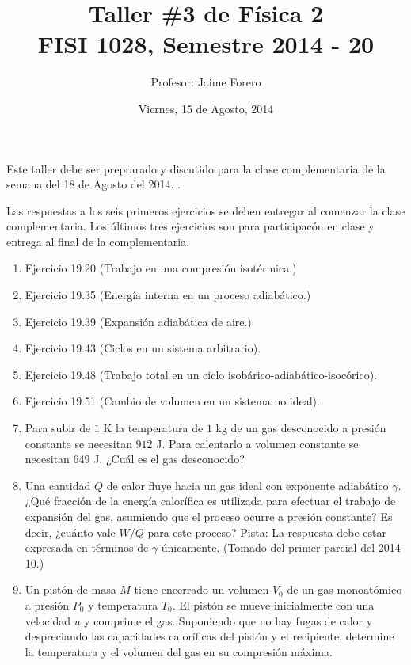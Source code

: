 \documentclass{article}
\title{Taller \#3 de F\'isica 2\\ FISI 1028, Semestre 2014 - 20}
\author{Profesor: Jaime Forero}
\date{Viernes, 15 de Agosto, 2014}
\begin{document}
\maketitle
\thispagestyle{empty}

\noindent
Este taller debe ser preprarado y discutido para la clase
complementaria de la semana del 18 de Agosto del 2014. .

Las respuestas a los seis primeros ejercicios se deben entregar al comenzar la
clase complementaria. Los \'ultimos tres ejercicios son para
participac\'on en clase y entrega al final de la complementaria. 

\begin{enumerate}

\item
Ejercicio 19.20 (Trabajo en una compresi\'on isot\'ermica.)


\item 
Ejercicio 19.35 (Energ\'ia interna en un proceso adiab\'atico.)

\item 
Ejercicio 19.39 (Expansi\'on adiab\'atica de aire.)

\item 
Ejercicio 19.43 (Ciclos en un sistema arbitrario).

\item
Ejercicio 19.48 (Trabajo total en un ciclo
isob\'arico-adiab\'atico-isoc\'orico).

\item 
Ejercicio 19.51 (Cambio de volumen en un sistema no ideal).

\item
  Para subir de $1$ K la temperatura de $1$ kg de un gas desconocido a
  presi\'on constante se necesitan $912$ J. Para calentarlo a volumen
  constante se necesitan $649$ J. ¿Cuál es el gas desconocido?
  

\item Una cantidad $Q$ de calor fluye hacia un gas ideal con
  exponente adiab\'atico $\gamma$. ¿Qu\'e fracci\'on de la energ\'ia
  calor\'ifica es utilizada para efectuar el trabajo de expansi\'on
  del gas, asumiendo que el proceso ocurre a presi\'on constante? Es
  decir, ¿cu\'anto vale $W/Q$ para este proceso? Pista: La respuesta debe
  estar expresada en t\'erminos de $\gamma$ \'unicamente.  (Tomado del
  primer parcial del 2014-10.)

\item
  Un pist\'on de masa $M$ tiene encerrado un volumen $V_0$ de un gas
  monoat\'omico a presi\'on $P_0$ y temperatura $T_0$. El pist\'on se
  mueve inicialmente con una velocidad $u$ y comprime el gas. Suponiendo
  que no hay fugas de calor y despreciando las capacidades calor\'ificas
  del pistón y el recipiente, determine la temperatura y el volumen
  del gas en su compresi\'on m\'axima.


\end{enumerate}
\end{document}
